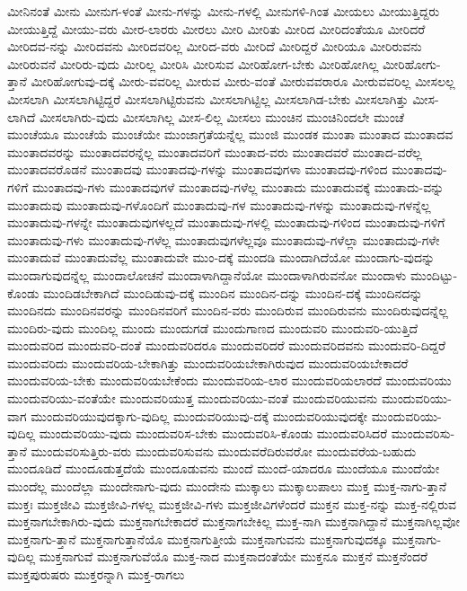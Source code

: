 {ಮೀನಿನಂತೆ
ಮೀನು
ಮೀನುಗ-ಳಂತೆ
ಮೀನು-ಗಳನ್ನು
ಮೀನು-ಗಳಲ್ಲಿ
ಮೀನುಗಳಿ-ಗಿಂತ
ಮೀಯಲು
ಮೀಯುತ್ತಿದ್ದರು
ಮೀಯುತ್ತಿದ್ದೆ
ಮೀಯು-ವರು
ಮೀರ-ಲಾರರು
ಮೀರಲು
ಮೀರಿ
ಮೀರಿತು
ಮೀರಿದ
ಮೀರಿದಂತೆಯೂ
ಮೀರಿದರೆ
ಮೀರಿದವ-ನನ್ನು
ಮೀರಿದವನು
ಮೀರಿದವರಿಲ್ಲ
ಮೀರಿದ-ವರು
ಮೀರಿದೆ
ಮೀರಿದ್ದರೆ
ಮೀರಿಯೂ
ಮೀರಿರುವನು
ಮೀರಿರುವನೆ
ಮೀರಿರು-ವುದು
ಮೀರಿಲ್ಲ
ಮೀರಿಸಿ
ಮೀರಿಸುವ
ಮೀರಿಹೋಗ-ಬೇಕು
ಮೀರಿಹೋಗಿಲ್ಲ
ಮೀರಿಹೋಗು-ತ್ತಾನೆ
ಮೀರಿಹೋಗುವು-ದಕ್ಕೆ
ಮೀರು-ವವರಿಲ್ಲ
ಮೀರುವ
ಮೀರು-ವಂತೆ
ಮೀರುವವರಾರೂ
ಮೀರುವವರಿಲ್ಲ
ಮೀಸಲಲ್ಲ
ಮೀಸಲಾಗಿ
ಮೀಸಲಾಗಿಟ್ಟಿದ್ದರೆ
ಮೀಸಲಾಗಿಟ್ಟಿರುವನು
ಮೀಸಲಾಗಿಟ್ಟಿಲ್ಲ
ಮೀಸಲಾಗಿಡ-ಬೇಕು
ಮೀಸಲಾಗಿತ್ತು
ಮೀಸ-ಲಾಗಿದೆ
ಮೀಸಲಾಗಿರು-ವುದು
ಮೀಸಲಾಗಿಲ್ಲ
ಮೀಸ-ಲಿಲ್ಲ
ಮೀಸಲು
ಮುಂಚಿನ
ಮುಂಚಿನಿಂದಲೇ
ಮುಂಚೆ
ಮುಂಚೆಯೂ
ಮುಂಚೆಯೆ
ಮುಂಚೆಯೇ
ಮುಂಜಾಗ್ರತೆಯನ್ನೆಲ್ಲ
ಮುಂಜಿ
ಮುಂಡಕ
ಮುಂತಾ
ಮುಂತಾದ
ಮುಂತಾದವ
ಮುಂತಾದವರನ್ನು
ಮುಂತಾದವರನ್ನೆಲ್ಲ
ಮುಂತಾದವರಿಗೆ
ಮುಂತಾದ-ವರು
ಮುಂತಾದವರೆ
ಮುಂತಾದ-ವರೆಲ್ಲ
ಮುಂತಾದವರೊಡನೆ
ಮುಂತಾದವು
ಮುಂತಾದವು-ಗಳನ್ನು
ಮುಂತಾದವುಗಳಾ
ಮುಂತಾದವು-ಗಳಿಂದ
ಮುಂತಾದವು-ಗಳಿಗೆ
ಮುಂತಾದವು-ಗಳು
ಮುಂತಾದವುಗಳೆ
ಮುಂತಾದವು-ಗಳೆಲ್ಲ
ಮುಂತಾದು
ಮುಂತಾದುವಕ್ಕೆ
ಮುಂತಾದು-ವನ್ನು
ಮುಂತಾದುವು
ಮುಂತಾದುವು-ಗಳೊಂದಿಗೆ
ಮುಂತಾದುವು-ಗಳ
ಮುಂತಾದುವು-ಗಳನ್ನು
ಮುಂತಾದುವು-ಗಳನ್ನೆಲ್ಲ
ಮುಂತಾದುವು-ಗಳನ್ನೇ
ಮುಂತಾದುವುಗಳಲ್ಲದೆ
ಮುಂತಾದುವು-ಗಳಲ್ಲಿ
ಮುಂತಾದುವು-ಗಳಿಂದ
ಮುಂತಾದುವು-ಗಳಿಗೆ
ಮುಂತಾದುವು-ಗಳು
ಮುಂತಾದುವು-ಗಳೆಲ್ಲ
ಮುಂತಾದುವುಗಳೆಲ್ಲವೂ
ಮುಂತಾದುವು-ಗಳೆಲ್ಲಾ
ಮುಂತಾದುವು-ಗಳೇ
ಮುಂತಾದುವೆ
ಮುಂತಾದುವೆಲ್ಲ
ಮುಂತಾದುವೇ
ಮುಂ-ದಕ್ಕೆ
ಮುಂದಡಿ
ಮುಂದಾಗಿದೆಯೋ
ಮುಂದಾಗು-ವುದನ್ನು
ಮುಂದಾಗುವುದನ್ನೆಲ್ಲ
ಮುಂದಾಲೋಚನೆ
ಮುಂದಾಳಾಗಿದ್ದಾನೆಯೋ
ಮುಂದಾಳಾಗಿರುವನೋ
ಮುಂದಾಳು
ಮುಂದಿಟ್ಟು-ಕೊಂಡು
ಮುಂದಿಡಬೇಕಾಗಿದೆ
ಮುಂದಿಡುವು-ದಕ್ಕೆ
ಮುಂದಿನ
ಮುಂದಿನ-ದನ್ನು
ಮುಂದಿನ-ದಕ್ಕೆ
ಮುಂದಿನದನ್ನು
ಮುಂದಿನದು
ಮುಂದಿನವರನ್ನು
ಮುಂದಿನವರಿಗೆ
ಮುಂದಿನ-ವರು
ಮುಂದಿರುವ
ಮುಂದಿರುವನು
ಮುಂದಿರುವುದನ್ನೆಲ್ಲ
ಮುಂದಿರು-ವುದು
ಮುಂದಿಲ್ಲ
ಮುಂದು
ಮುಂದುಗಡೆ
ಮುಂದುಗಾಣದ
ಮುಂದುವರಿ
ಮುಂದುವರಿ-ಯುತ್ತಿದೆ
ಮುಂದುವರಿದ
ಮುಂದುವರಿ-ದಂತೆ
ಮುಂದುವರಿದರೂ
ಮುಂದುವರಿದರೆ
ಮುಂದುವರಿದವನು
ಮುಂದುವರಿ-ದಿದ್ದರೆ
ಮುಂದುವರಿದು
ಮುಂದುವರಿಯ-ಬೇಕಾಗಿತ್ತು
ಮುಂದುವರಿಯಬೇಕಾಗಿರುವುದ
ಮುಂದುವರಿಯಬೇಕಾದರೆ
ಮುಂದುವರಿಯ-ಬೇಕು
ಮುಂದುವರಿಯಬೇಕೆಂದು
ಮುಂದುವರಿಯ-ಲಾರ
ಮುಂದುವರಿಯಲಾರದೆ
ಮುಂದುವರಿಯು
ಮುಂದುವರಿಯು-ವಂತೆಯೇ
ಮುಂದುವರಿಯುತ್ತ
ಮುಂದುವರಿಯು-ವಂತೆ
ಮುಂದುವರಿಯುವನು
ಮುಂದುವರಿಯು-ವಾಗ
ಮುಂದುವರಿಯುವುದಕ್ಕಾಗು-ವುದಿಲ್ಲ
ಮುಂದುವರಿಯುವು-ದಕ್ಕೆ
ಮುಂದುವರಿಯುವುದಕ್ಕೇ
ಮುಂದುವರಿಯು-ವುದಿಲ್ಲ
ಮುಂದುವರಿಯು-ವುದು
ಮುಂದುವರಿಸ-ಬೇಕು
ಮುಂದುವರಿಸಿ-ಕೊಂಡು
ಮುಂದುವರಿಸಿದರೆ
ಮುಂದುವರಿಸು-ತ್ತಾನೆ
ಮುಂದುವರಿಸುತ್ತಿರು-ವರು
ಮುಂದುವರಿಸುವನು
ಮುಂದುವರೆದಿರುವರೋ
ಮುಂದುವರೆಯ-ಬಹುದು
ಮುಂದೂಡಿದೆ
ಮುಂದೂಡುತ್ತದೆಯೆ
ಮುಂದೂಡುವನು
ಮುಂದೆ
ಮುಂದೆ-ಯಾದರೂ
ಮುಂದೆಯೂ
ಮುಂದೆಯೇ
ಮುಂದೆಲ್ಲ
ಮುಂದೆಲ್ಲಾ
ಮುಂದೇನಾಗು-ವುದು
ಮುಂದೇನು
ಮುಕ್ಕಾಲು
ಮುಕ್ಕಾಲುಪಾಲು
ಮುಕ್ತ
ಮುಕ್ತ-ನಾಗು-ತ್ತಾನೆ
ಮುಕ್ತಃ
ಮುಕ್ತಜೀವಿ
ಮುಕ್ತಜೀವಿ-ಗಳಲ್ಲ
ಮುಕ್ತಜೀವಿ-ಗಳು
ಮುಕ್ತಜೀವಿಗಳೆಂದರೆ
ಮುಕ್ತನ
ಮುಕ್ತ-ನನ್ನು
ಮುಕ್ತ-ನಲ್ಲಿರುವ
ಮುಕ್ತನಾಗಬೇಕಾಗಿರು-ವುದು
ಮುಕ್ತನಾಗಬೇಕಾದರೆ
ಮುಕ್ತನಾಗಬೇಕಿಲ್ಲ
ಮುಕ್ತ-ನಾಗಿ
ಮುಕ್ತನಾಗಿದ್ದಾನೆ
ಮುಕ್ತನಾಗಿಲ್ಲವೋ
ಮುಕ್ತನಾಗು-ತ್ತಾನೆ
ಮುಕ್ತನಾಗುತ್ತಾನೆಯೊ
ಮುಕ್ತನಾಗುತ್ತೀಯೆ
ಮುಕ್ತನಾಗುವನು
ಮುಕ್ತನಾಗುವುದಕ್ಕೂ
ಮುಕ್ತನಾಗು-ವುದಿಲ್ಲ
ಮುಕ್ತನಾಗುವೆ
ಮುಕ್ತನಾಗುವೆಯೊ
ಮುಕ್ತ-ನಾದ
ಮುಕ್ತನಾದಂತೆಯೇ
ಮುಕ್ತನೂ
ಮುಕ್ತನೆ
ಮುಕ್ತನೆಂದರೆ
ಮುಕ್ತಪುರುಷರು
ಮುಕ್ತರನ್ನಾಗಿ
ಮುಕ್ತ-ರಾಗಲು
}
